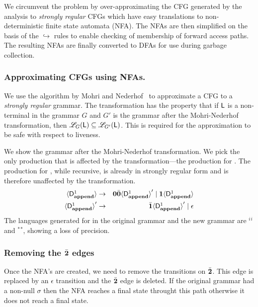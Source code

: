 \documentclass[9pt]{sigplanconf}
\newcommand{\comment}[1]{{\color{Myblue}{(#1)}}}
\begin{document}
\begin{enumerate}
  We circumvent the problem by over-approximating the CFG generated by
the analysis to  {\em
  strongly  regular}  CFGs which  have   easy
translations to non-deterministic finite state automata (NFA). The
NFAs are then simplified on the
basis  of  the  $\hookrightarrow$  rules to  enable  checking  of
membership of forward access paths. The resulting NFAs are   finally
converted to DFAs for use during garbage collection.
\comment{Fix all comments and produce first draft}
\subsubsection{Approximating CFGs using NFAs.}
\label{sec:NFA-approx}
\comment{Change the language and the example}
We use the
algorithm  by  Mohri  and Nederhof~\cite{mohri00regular}   to
approximate a CFG  to a   {\em strongly regular\/} grammar.  The
transformation has  the  property that  if $\mathsf{L}$  is a
non-terminal  in the grammar  $G$ and  $G'$ is  the grammar  after the
Mohri-Nederhof transformation, then  ${\mathscr L}_G(\mathsf{L}) \subseteq
{\mathscr
  L}_{G'}(\mathsf{L})$.    This  is   required  for the
approximation to be safe with respect to liveness.

We show the  grammar after the Mohri-Nederhof
transformation. We  pick the only production that  is affected by
the transformation---the production for .  The
production for , while  recursive, is already in
strongly  regular  form  and   is  therefore  unaffected  by  the
transformation.
 \begin{eqnarray*}
  \var{\Df{\append}{1}}
  &\rightarrow&               \acar\bcar \var{\Df{\append}{1}}'  \mid
  \acdr\var{\Df{\append}{1}} \\
\var{\Df{\append}{1}}'  &\rightarrow&   \bcdr\var{\Df{\append}{1}}'
\mid \epsilon
\end{eqnarray*}
The  languages
generated for   in  the original grammar  and the
new       grammar      are       \acdr$^i$\acar\bcar\bcdr$^i$      and
\acdr$^*$\acar\bcar\bcdr$^*$, showing a  loss of  precision.

\subsubsection{Removing the $\bar{\mathbf{2}}$ edges}
Once the NFA's are created, we need to remove the transitions on
$\bar{\mathbf{2}}$. This edge is replaced by an $\epsilon$ transition and the
$\bar{\mathbf{2}}$ edge is deleted. If the original grammar had a non-null
$\sigma$ then the NFA reaches a final state throught this path
otherwise it does not reach a final state.\comment{Need to rewrite
this}

\end{enumerate}
\end{document}
